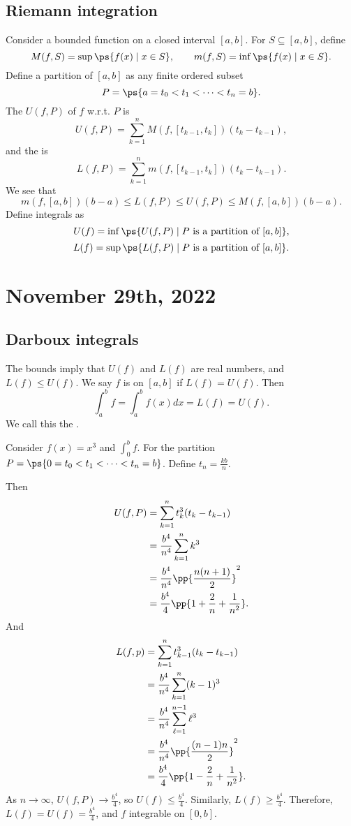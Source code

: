 \documentclass[11pt]{scrartcl}
\numberwithin{equation}{section}
\begin{document}
\subsection{Riemann integration}
Consider a bounded function on a closed interval $[a,b]$. For 
$S \subseteq [a,b]$, define 
\[
    M(f,S) = \sup\ps{f(x)\mid x\in S}, \qquad m(f,S) = 
    \inf\ps{f(x)\mid x\in S}.
\]
Define a partition of $[a,b]$ as any finite ordered subset 
\[
    P = \ps{a=t_0<t_1<\cdots<t_n=b}.
\]
The  $U(f,P)$ of $f$ w.r.t. $P$ is 
\[
    U(f,P) = \sum_{k=1}^{n}M(f,[t_{k-1},t_k])(t_k-t_{k-1}),
\]
and the  is 
\[
    L(f,P) = \sum_{k=1}^{n}m(f,[t_{k-1},t_k])(t_k-t_{k-1}).
\]
We see that 
\[
    m(f,[a,b])(b-a) \leq L(f,P) \leq U(f,P) \leq M(f,[a,b])(b-a).
\]
Define integrals as 
\[
    U(f) = \inf\ps{U(f,P)\mid P \text{ is a partition of }[a,b]},
\]
\[
    L(f) = \sup\ps{L(f,P)\mid P \text{ is a partition of }[a,b]}.
\]
\clearpage
\section{November 29th, 2022}

\subsection{Darboux integrals}

The bounds imply that $U(f)$ and $L(f)$ are real numbers, and 
$L(f)\leq U(f)$. We say $f$ is  on $[a,b]$ if 
$L(f)=U(f)$.
Then 
\[
    \int_a^b f = \int_a^b f(x)dx = L(f) = U(f).
\]
We call this the .

\begin{example}
    Consider $f(x)=x^3$ and $\int_0^bf$. For the partition 
    $P=\ps{0=t_0<t_1<\cdots<t_n=b}$. Define $t_n = \frac{kb}{n}$.

    Then 
    \begin{align*}
        U(f,P) &= \sum_{k=1}^{n}t_k^3(t_k-t_{k-1})\\ 
        &= \frac{b^4}{n^4}\sum_{k=1}^{n}k^3\\ 
        &= \frac{b^4}{n^4}\pp{\frac{n(n+1)}{2}}^2 \\
        &= \frac{b^4}{4}\pp{1+\frac{2}{n}+\frac{1}{n^2}}.
    \end{align*}
    And 
    \begin{align*}
        L(f,p) &= \sum_{k=1}^{n}t_{k-1}^3(t_k-t_{k-1}) \\
        &= \frac{b^4}{n^4}\sum_{k=1}^{n}(k-1)^3 \\
        &= \frac{b^4}{n^4}\sum_{\ell=1}^{n-1}\ell^3 \\
        &= \frac{b^4}{n^4}\pp{\frac{(n-1)n}{2}}^2 \\
        &= \frac{b^4}{4}\pp{1-\frac{2}{n}+\frac{1}{n^2}}.
    \end{align*}
    As $n\to\infty$, $U(f,P)\to \frac{b^4}{4}$, so $U(f)\leq\frac{b^4}{4}$. 
    Similarly, $L(f)\geq \frac{b^4}{4}$. Therefore, $L(f)=U(f) = \frac{b^4}{4}$, and $f$ integrable on $[0,b]$. 
\end{example}
\end{document}
